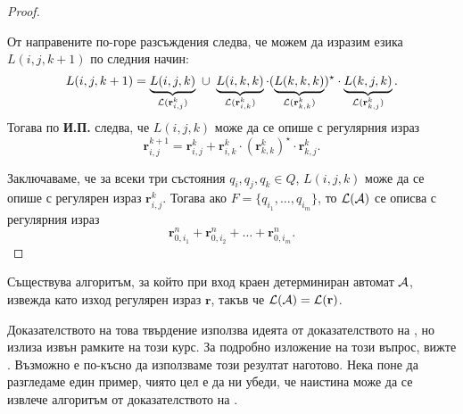 \begin{proof}
\begin{enumerate}[a)]
    От направените по-горе разсъждения следва, че можем да изразим езика $L(i,j,k+1)$ по следния начин:
    \[L(i,j,k+1) = \underbrace{L(i,j,k)}_{\L(\mathbf{r}^{k}_{i,j})}\ \cup\ \underbrace{L(i,k,k)}_{\L(\mathbf{r}^{k}_{i,k})}\cdot (\underbrace{L(k,k,k)}_{\L(\mathbf{r}^{k}_{k,k})})^\star \cdot \underbrace{L(k,j,k)}_{\L(\mathbf{r}^{k}_{k,j})}.\]
    Тогава по {\bf И.П.} следва, че $L(i,j,k)$ може да се опише с регулярния израз
    \begin{equation}
      \label{eq:kleene}
      \mathbf{r}^{k+1}_{i,j} = \mathbf{r}^{k}_{i,j} + \mathbf{r}^{k}_{i,k}\cdot (\mathbf{r}^{k}_{k,k})^\star\cdot \mathbf{r}^{k}_{k,j}.
    \end{equation}
  \end{enumerate}
  Заключаваме, че за всеки три състояния $q_i,q_j,q_k \in Q$, $L(i,j,k)$ може да се опише с регулярен израз $\mathbf{r}^{k}_{i,j}$.
  Тогава ако $F = \{q_{i_1},\dots,q_{i_m}\}$, то $\mathcal{L}(\mathcal{A})$ се описва с регулярния израз
  \[\mathbf{r}^n_{0,i_1} + \mathbf{r}^n_{0,i_2} + \dots + \mathbf{r}^n_{0,i_m}.\]
\end{proof}

\begin{proposition}
  Съществува алгоритъм, за който при вход краен детерминиран автомат $\mathcal{A}$,
  извежда като изход регулярен израз $\mathbf{r}$, такъв че $\mathcal{L}(\mathcal{A}) = \mathcal{L}(\mathbf{r})$.
\end{proposition}

Доказателството на това твърдение използва идеята от доказателството на ,
но излиза извън рамките на този курс. За подробно изложение на този въпрос, вижте \cite[стр. 69]{sipser3}.
Възможно е по-късно да използваме този резултат наготово.
Нека поне да разгледаме един пример, чиято цел е да ни убеди, 
че наистина може да се извлече алгоритъм от доказателството на .



